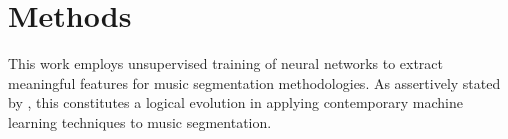 \chapter{Methods}

This work employs unsupervised training of neural networks to extract meaningful features for music segmentation methodologies. As assertively stated by \cite{deepfeaturesegment}, this constitutes a logical evolution in applying contemporary machine learning techniques to music segmentation.




\newpage



